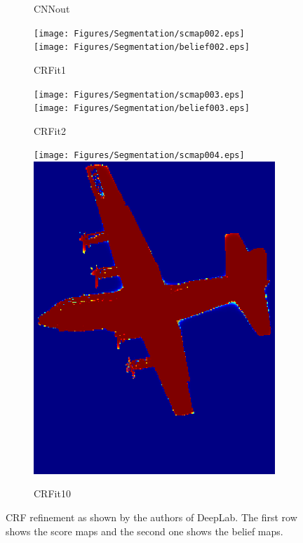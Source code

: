 \begin{figure}[!hb]
\begin{subfigure}{0.19\linewidth}
		\caption{\ac{CNN}out}
	\end{subfigure}
	\hfill
	\begin{subfigure}{0.19\linewidth}
		\texttt{[image: Figures/Segmentation/scmap002.eps]}\\
		\texttt{[image: Figures/Segmentation/belief002.eps]}
		\caption{\ac{CRF}it1}
	\end{subfigure}
	\hfill
	\begin{subfigure}{0.19\linewidth}
		\texttt{[image: Figures/Segmentation/scmap003.eps]}\\
		\texttt{[image: Figures/Segmentation/belief003.eps]}
		\caption{\ac{CRF}it2}
	\end{subfigure}
	\hfill
	\begin{subfigure}{0.19\linewidth}
		\texttt{[image: Figures/Segmentation/scmap004.eps]}\\
		\includegraphics[width=\linewidth]{Figures/Segmentation/belief004.eps}
		\caption{\ac{CRF}it10}
	\end{subfigure}
	\hfill
	\caption{\ac{CRF} refinement as shown by the authors of DeepLab\cite{Chen2014a}. The first row shows the score maps and the second one shows the belief maps.}
	\label{fig:semseg:crf-deeplab}
\end{figure}

